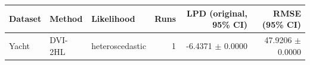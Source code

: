 \begin{tabular}{lllrrr}
\toprule
Dataset & Method & Likelihood & Runs & LPD (original, 95\% CI) & RMSE (95\% CI) \\
\midrule
Yacht & DVI-2HL & heteroscedastic & 1 & -6.4371 $\pm$ 0.0000 & 47.9206 $\pm$ 0.0000 \\
\bottomrule
\end{tabular}
